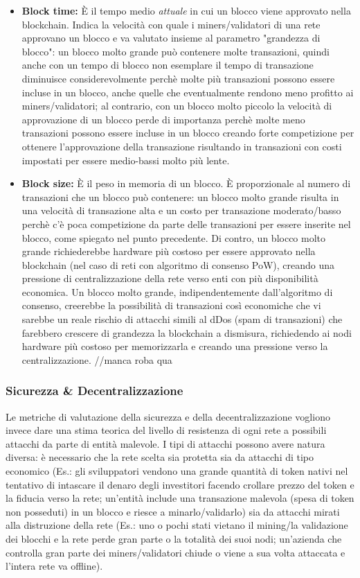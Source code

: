 \documentclass[a4paper, 12pt]{article}
\begin{document}
\begin{itemize}
\item \textbf{Block time: }
È il tempo medio \textit{attuale} in cui un blocco viene approvato nella blockchain. Indica la velocità con quale i miners/validatori di una rete approvano un blocco e va valutato insieme al parametro "grandezza di blocco": un blocco molto grande può contenere molte transazioni, quindi anche con un tempo di blocco non esemplare il tempo di transazione diminuisce considerevolmente
perchè molte più transazioni possono essere incluse in un blocco, anche quelle che eventualmente rendono meno profitto ai miners/validatori; al contrario, con un blocco molto piccolo la velocità
di approvazione di un blocco perde di importanza perchè molte meno transazioni possono essere incluse in un blocco creando forte competizione per ottenere l'approvazione della transazione risultando
in transazioni con costi impostati per essere medio-bassi molto più lente.

\item \textbf{Block size: }
È il peso in memoria di un blocco. È proporzionale al numero di transazioni che un blocco può contenere: un blocco molto grande risulta in una velocità di transazione alta e un costo per transazione
moderato/basso perchè c'è poca competizione da parte delle transazioni per essere inserite nel blocco, come spiegato nel punto precedente. Di contro, un blocco molto grande richiederebbe
hardware più costoso per essere approvato nella blockchain (nel caso di reti con algoritmo di consenso PoW), creando una pressione di centralizzazione della rete verso enti con più disponibilità economica. Un blocco molto grande, indipendentemente dall'algoritmo di consenso, creerebbe la possibilità di transazioni così economiche che vi sarebbe un reale rischio di attacchi simili
al dDos (spam di transazioni) che farebbero crescere di grandezza la blockchain a dismisura, richiedendo ai nodi hardware più costoso per memorizzarla e creando una pressione verso la centralizzazione. //manca roba qua


\end{itemize}
\subsubsection*{Sicurezza \& Decentralizzazione}
Le metriche di valutazione della sicurezza e della decentralizzazione vogliono invece dare una stima teorica del livello di resistenza di ogni rete a possibili attacchi da parte di entità
malevole. I tipi di attacchi possono avere natura diversa: è necessario che la rete scelta sia protetta sia da attacchi di tipo economico (Es.: gli sviluppatori vendono una grande quantità
di token nativi nel tentativo di intascare il denaro degli investitori facendo crollare prezzo del token e la fiducia verso la rete; un'entità include una transazione malevola (spesa
di token non posseduti) in un blocco e riesce a minarlo/validarlo) sia da attacchi mirati alla distruzione della rete (Es.: uno o pochi stati vietano il mining/la validazione dei blocchi
e la rete perde gran parte o la totalità dei suoi nodi; un'azienda che controlla gran parte dei miners/validatori chiude o viene a sua volta attaccata e l'intera rete va offline).
\end{document}
